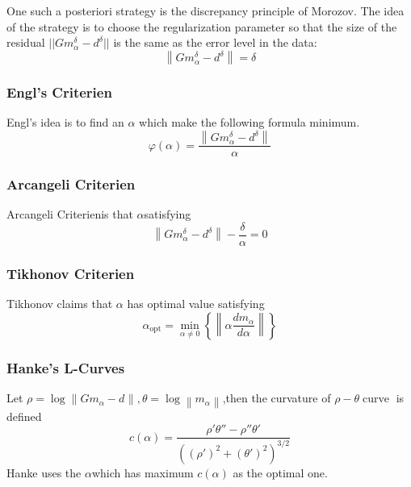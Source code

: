 \documentclass[a4paper]{article}
\newcommand{\tmop}[1]{\ensuremath{\operatorname{#1}}}
\begin{document}
One such a posteriori strategy is the discrepancy principle of Morozov. The
idea of the strategy is to choose the regularization parameter so that the
size of the residual $||G m_{\alpha}^{\delta} - d^{\delta} ||$ is the same as
the error level in the data:
\begin{equation}
  \left\| G m^{\delta}_{\alpha} - d^{\delta} \right\| = \delta
\end{equation}


\subsubsection{Engl's Criterien}

Engl's idea{\cite{7}} is to find an $\alpha$ which make the following formula
minimum.
\begin{equation}
  \varphi \left( \alpha \right) = \frac{\left\| G m_{\alpha}^{\delta} -
  d^{\delta} \right\|}{\alpha}
\end{equation}

\subsubsection{Arcangeli Criterien}

Arcangeli Criterien{\cite{9}}is that $\alpha$satisfying
\begin{equation}
  \left\| G m_{\alpha}^{\delta} - d^{\delta} \right\| - \frac{\delta}{\alpha}
  = 0
\end{equation}

\subsubsection{Tikhonov Criterien}

Tikhonov claims{\cite{10}} that $\alpha$ has optimal value satisfying
\begin{equation}
  \alpha_{\tmop{opt}} = \min_{\alpha \neq 0} \left\{ \left\| \alpha \frac{d
  m^{}_{\alpha}}{d \alpha} \right\| \right\}
\end{equation}

\subsubsection{Hanke's L-Curves}

Let $\rho = \log \left\| G m_{\alpha}^{} - d^{} \right\|, \theta = \log
\left\| m_{\alpha} \right\|$,then the curvature of $\rho - \theta
\tmop{curve}$ is defined
\begin{equation}
  c \left( \alpha \right) = \frac{\rho' \theta'' - \rho'' \theta'}{\left(
  \left( \rho' \right)^2 + \left( \theta' \right)^2 \right)^{3 / 2}}
\end{equation}
Hanke uses the $\alpha$which has maximum $c \left( \alpha \right)$ as the
optimal one{\cite{11}}.
\end{document}
